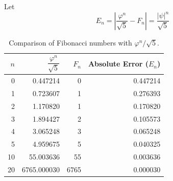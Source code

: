 \documentclass[10pt,letterpaper]{article}
\begin{document}
Let
\[
E_n =
\left|\dfrac{\varphi^n}{\sqrt{5}} - F_n\right|
= \dfrac{|\psi|^n}{\sqrt{5}}
\]

\begin{table}[htbp]
    \centering
    \renewcommand{\arraystretch}{1.4}

    \begin{tabular}{rrrr}
        \toprule
        $n$ &
        $\dfrac{\varphi^n}{\sqrt{5}}$ &
        $F_n$ &
        Absolute Error ($E_n$) \\
        \midrule
         0 &    0.447214 &    0 & 0.447214 \\
         1 &    0.723607 &    1 & 0.276393 \\
         2 &    1.170820 &    1 & 0.170820 \\
         3 &    1.894427 &    2 & 0.105573 \\
         4 &    3.065248 &    3 & 0.065248 \\
         5 &    4.959675 &    5 & 0.040325 \\
        10 &   55.003636 &   55 & 0.003636 \\
        20 & 6765.000030 & 6765 & 0.000030 \\
        \bottomrule
    \end{tabular}

    \caption{Comparison of Fibonacci numbers with
    $\varphi^n/\sqrt{5}$.}
    \label{tab:fibonacci-error}
\end{table}
\end{document}
